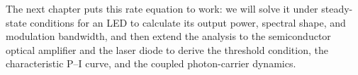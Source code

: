 The next chapter puts this rate equation to work: we will solve it under steady-state conditions for an LED to calculate its output power, spectral shape, and modulation bandwidth, and then extend the analysis to the semiconductor optical amplifier and the laser diode to derive the threshold condition, the characteristic P–I curve, and the coupled photon-carrier dynamics.
